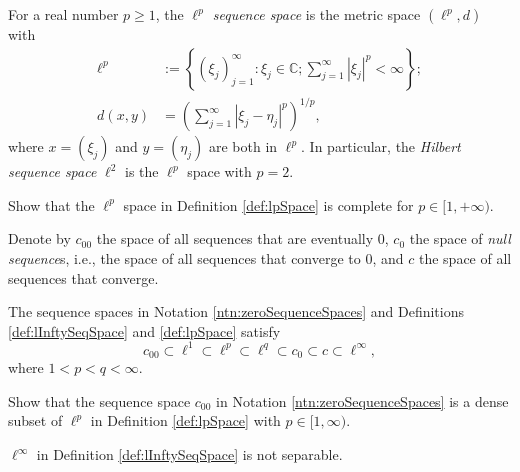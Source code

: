 \begin{defn}
  \label{def:lpSpace}
  For a real number $p\ge 1$,
   the \emph{$\ell^p$ sequence space} is the metric space $(\ell^p, d)$
   with
  \begin{align}
    \label{eq:lpSpace}
    \ell^p &:= \left\{
               (\xi_j)_{j=1}^{\infty}: \xi_j\in \mathbb{C};
               \sum_{j=1}^{\infty} |\xi_j|^p < \infty
    \right\};
    \\
    \label{eq:lpMetric}
    d(x,y) &= \left(\sum_{j=1}^{\infty} |\xi_j -\eta_j|^p\right)^{1/p},
  \end{align}             
  where $x=(\xi_j)$ and $y=(\eta_j)$ are both in $\ell^p$.
  In particular, the \emph{Hilbert sequence space} $\ell^2$
   is the $\ell^p$ space with $p=2$.
\end{defn}

\begin{exc}
  \label{exc:ellPisComplete}
  Show that the $\ell^p$ space in Definition \ref{def:lpSpace}
  is complete for $p\in [1,+\infty)$.
\end{exc}

\begin{ntn}
  \label{ntn:zeroSequenceSpaces}
  Denote by $c_{00}$ the space of all sequences
  that are eventually 0,
  $c_0$ the space of \emph{null sequence}s,
  i.e., the space of all sequences that converge to 0,
  and $c$ the space of all sequences that converge.
\end{ntn}

\begin{lem}
  \label{lem:filtrationOfSequenceSpaces}
  The sequence spaces in Notation \ref{ntn:zeroSequenceSpaces}
  and Definitions \ref{def:lInftySeqSpace} and \ref{def:lpSpace}
  satisfy
  \begin{equation}
    \label{eq:filtrationOfSequenceSpaces}
    c_{00} \subset \ell^1 \subset \ell^p  \subset \ell^q  
     \subset c_0 \subset c \subset \ell^{\infty},
  \end{equation}
  where $1<p<q<\infty$. 
\end{lem}

\begin{exc}
  \label{exc:c00isDenseInEll2}
  Show that the sequence space $c_{00}$
  in Notation \ref{ntn:zeroSequenceSpaces}
  is a dense subset of $\ell^p$
  in Definition \ref{def:lpSpace} with $p\in[1,\infty)$. 
\end{exc}

\begin{lem}
  \label{lem:ellInftyisNotSeparable}
  $\ell^{\infty}$ in Definition \ref{def:lInftySeqSpace} is not separable.
\end{lem}

